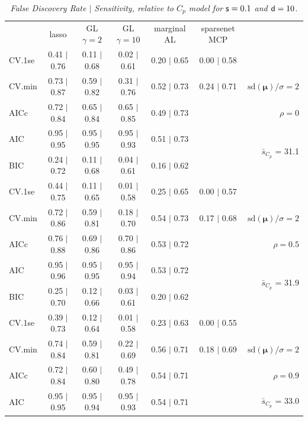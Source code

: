 \documentclass[12pt]{article}
\newcommand{\mr}[1]{\mathrm{#1}}
\newcommand{\bm}[1]{\mathbf{#1}}
\begin{document}
\begin{table}[p]\vspace{-.5cm}
\caption[l]{\it False Discovery Rate $\mid$ Sensitivity, relative to $C_p$ model  for ${\sf s}=0.1$ and ${\sf d}=10$.}
\vspace{-.5cm}
\small{}
\begin{center}
\begin{tabular}{l*{5}{c}|r}
 & lasso & GL $\gamma=2$ & GL $\gamma=10$ & marginal AL & sparsenet MCP  & \\
 \cline{1-7}
CV.1se & 0.41 $\mid$ 0.76 & 0.11 $\mid$ 0.68 & 0.02 $\mid$ 0.61 & 0.20 $\mid$ 0.65 & 0.00 $\mid$ 0.58 &\\
CV.min & 0.73 $\mid$ 0.87 & 0.59 $\mid$ 0.82 & 0.31 $\mid$ 0.76 & 0.52 $\mid$ 0.73 & 0.24 $\mid$ 0.71 &  $\mr{sd}(\bm{\mu})/\sigma=2$ \\
AICc & 0.72 $\mid$ 0.84 & 0.65 $\mid$ 0.84 & 0.65 $\mid$ 0.85 & 0.49 $\mid$ 0.73 & & $\rho=0$ \\
AIC & 0.95 $\mid$ 0.95 & 0.95 $\mid$ 0.95 & 0.95 $\mid$ 0.93 & 0.51 $\mid$ 0.73 & & \multirow{2}{*}{$\bar{s}_{C_p}$ = 31.1} \\
BIC & 0.24 $\mid$ 0.72 & 0.11 $\mid$ 0.68 & 0.04 $\mid$ 0.61 & 0.16 $\mid$ 0.62 & & \\
 \hline 
CV.1se & 0.44 $\mid$ 0.75 & 0.11 $\mid$ 0.65 & 0.01 $\mid$ 0.58 & 0.25 $\mid$ 0.65 & 0.00 $\mid$ 0.57 &\\
CV.min & 0.72 $\mid$ 0.86 & 0.59 $\mid$ 0.81 & 0.18 $\mid$ 0.70 & 0.54 $\mid$ 0.73 & 0.17 $\mid$ 0.68 &  $\mr{sd}(\bm{\mu})/\sigma=2$ \\
AICc & 0.76 $\mid$ 0.88 & 0.69 $\mid$ 0.86 & 0.70 $\mid$ 0.86 & 0.53 $\mid$ 0.72 & & $\rho=0.5$ \\
AIC & 0.95 $\mid$ 0.96 & 0.95 $\mid$ 0.95 & 0.95 $\mid$ 0.94 & 0.53 $\mid$ 0.72 & & \multirow{2}{*}{$\bar{s}_{C_p}$ = 31.9} \\
BIC & 0.25 $\mid$ 0.70 & 0.12 $\mid$ 0.66 & 0.03 $\mid$ 0.61 & 0.20 $\mid$ 0.62 & & \\
 \hline 
CV.1se & 0.39 $\mid$ 0.73 & 0.12 $\mid$ 0.64 & 0.01 $\mid$ 0.58 & 0.23 $\mid$ 0.63 & 0.00 $\mid$ 0.55 &\\
CV.min & 0.74 $\mid$ 0.84 & 0.59 $\mid$ 0.81 & 0.22 $\mid$ 0.69 & 0.56 $\mid$ 0.71 & 0.18 $\mid$ 0.69 &  $\mr{sd}(\bm{\mu})/\sigma=2$ \\
AICc & 0.72 $\mid$ 0.84 & 0.60 $\mid$ 0.80 & 0.49 $\mid$ 0.78 & 0.54 $\mid$ 0.71 & & $\rho=0.9$ \\
AIC & 0.95 $\mid$ 0.95 & 0.95 $\mid$ 0.94 & 0.95 $\mid$ 0.93 & 0.54 $\mid$ 0.71 & & \multirow{2}{*}{$\bar{s}_{C_p}$ = 33.0} \\

\end{tabular}
\end{center}
\end{table}
\end{document}
